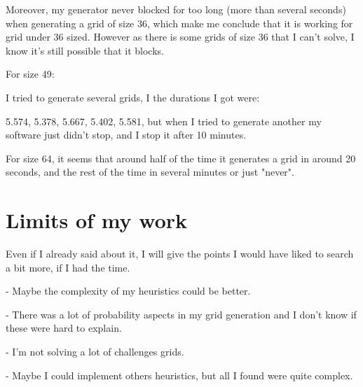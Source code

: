 \documentclass{article}
\begin{document}
Moreover, my generator never blocked for too long (more than several seconds) when generating a grid of size 36, which make me conclude that it is working for grid under 36 sized. However as there is some grids of size 36 that I can't solve, I know it's still possible that it blocks.

\vspace{1\baselineskip}
For size 49:

I tried to generate several grids, I the durations I got were:

5.574, 5.378, 5.667, 5.402, 5.581, but when I tried to generate another my software just didn't stop, and I stop it after 10 minutes.

\vspace{1\baselineskip}
For size 64, it seems that around half of the time it generates a grid in around 20 seconds, and the rest of the time in several minutes or just "never".

\section{Limits of my work}

Even if I already said about it, I will give the points I would have liked to search a bit more, if I had the time.

- Maybe the complexity of my heuristics could be better.

- There was a lot of probability aspects in my grid generation and I don't know if these were hard to explain.

- I'm not solving a lot of challenges grids.

- Maybe I could implement others heuristics, but all I found were quite complex.
\end{document}
